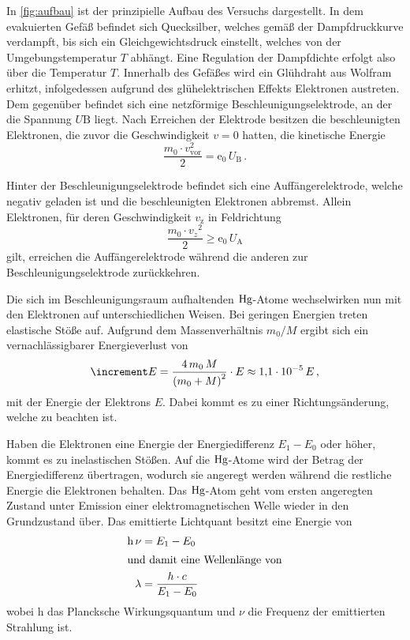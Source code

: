 In \autoref{fig:aufbau} ist der prinzipielle Aufbau des Versuchs dargestellt.
In dem evakuierten Gefäß befindet sich Quecksilber, welches gemäß der Dampfdruckkurve verdampft,
bis sich ein Gleichgewichtsdruck einstellt, welches von der Umgebungstemperatur $T$ abhängt.
Eine Regulation der Dampfdichte erfolgt also über die Temperatur $T$.
Innerhalb des Gefäßes wird ein Glühdraht aus Wolfram erhitzt, 
infolgedessen aufgrund des glühelektrischen Effekts Elektronen austreten.
Dem gegenüber befindet sich eine netzförmige Beschleunigungselektrode, an der die Spannung $U\text{B}$ liegt.
Nach Erreichen der Elektrode besitzen die beschleunigten Elektronen, die zuvor die Geschwindigkeit $v = 0$ hatten, die kinetische Energie
\begin{equation}
    \frac{m_{0} \cdot v_{\mathrm{vor}}^{2}}{2} = \mathrm{e}_{0} \, U_{\mathrm{B}} \, .
\end{equation}

Hinter der Beschleunigungselektrode befindet sich eine Auffängerelektrode, 
welche negativ geladen ist und die beschleunigten Elektronen abbremst.
Allein Elektronen, für deren Geschwindigkeit $v_\text{z}$ in Feldrichtung
\begin{equation}
    \frac{m_{0} \cdot v_{z}{ }^{2}}{2}  \geq \mathrm{e}_{0} \, U_{\mathrm{A}}
\end{equation}
gilt, erreichen die Auffängerelektrode während die anderen zur Beschleunigungselektrode zurückkehren.

Die sich im Beschleunigungsraum aufhaltenden $\ce{Hg}$-Atome wechselwirken nun mit den Elektronen auf unterschiedlichen Weisen.
Bei geringen Energien treten elastische Stöße auf. 
Aufgrund dem Massenverhältnis $m_0/M$ ergibt sich ein vernachlässigbarer Energieverlust von
\begin{equation}
    \increment E=\frac{4 \, m_{0} \, M}{\left(m_{0}+M\right)^{2}} \cdot E \approx \num{1.1e{-5}} \, E \, ,
\end{equation}
mit der Energie der Elektrons $E$. 
Dabei kommt es zu einer Richtungsänderung, welche zu beachten ist.

Haben die Elektronen eine Energie der Energiedifferenz $E_1 - E_0$ oder höher, kommt es zu inelastischen Stößen.
Auf die $\ce{Hg}$-Atome wird der Betrag der Energiedifferenz übertragen, wodurch sie angeregt werden während die restliche Energie die Elektronen behalten. 
Das $\ce{Hg}$-Atom geht vom ersten angeregten Zustand unter Emission einer elektromagnetischen Welle wieder in den Grundzustand über. 
Das emittierte Lichtquant besitzt eine Energie von
\begin{align}
    \text{h} \, \nu &= E_1 - E_0 \\
    \intertext{und damit eine Wellenlänge von}
    \lambda &= \frac{h \cdot c}{E_1 - E_0}
\end{align}
wobei h das Plancksche Wirkungsquantum und $\nu$ die Frequenz der emittierten Strahlung ist.

